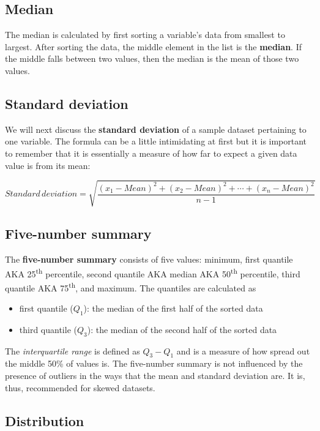 \documentclass[12pt,]{krantz}
\providecommand{\tightlist}{%
  \setlength{\itemsep}{0pt}\setlength{\parskip}{0pt}}
\theoremstyle{definition}
\theoremstyle{definition}
\theoremstyle{definition}
\theoremstyle{remark}
\begin{document}
\subsection{Median}\label{median}

The median is calculated by first sorting a variable's data from
smallest to largest. After sorting the data, the middle element in the
list is the \textbf{median}. If the middle falls between two values,
then the median is the mean of those two values.

\subsection{Standard deviation}\label{standard-deviation}

We will next discuss the \textbf{standard deviation} of a sample dataset
pertaining to one variable. The formula can be a little intimidating at
first but it is important to remember that it is essentially a measure
of how far to expect a given data value is from its mean:

\[Standard \, deviation = \sqrt{\frac{(x_1 - Mean)^2 + (x_2 - Mean)^2 + \cdots + (x_n - Mean)^2}{n - 1}}\]

\subsection{Five-number summary}\label{five-number-summary}

The \textbf{five-number summary} consists of five values: minimum, first
quantile AKA 25\textsuperscript{th} percentile, second quantile AKA
median AKA 50\textsuperscript{th} percentile, third quantile AKA
75\textsuperscript{th}, and maximum. The quantiles are calculated as

\begin{itemize}
\tightlist
\item
  first quantile (\(Q_1\)): the median of the first half of the sorted
  data
\item
  third quantile (\(Q_3\)): the median of the second half of the sorted
  data
\end{itemize}

The \emph{interquartile range} is defined as \(Q_3 - Q_1\) and is a
measure of how spread out the middle 50\% of values is. The five-number
summary is not influenced by the presence of outliers in the ways that
the mean and standard deviation are. It is, thus, recommended for skewed
datasets.

\subsection{Distribution}\label{distribution}
\end{document}

